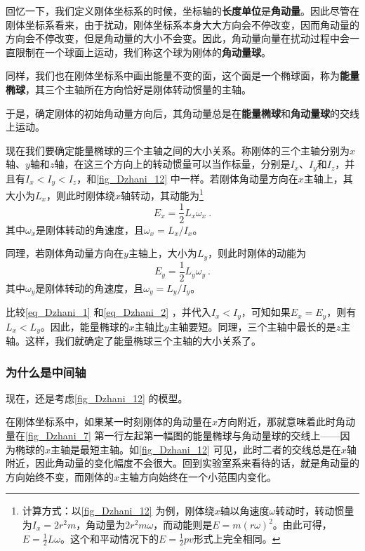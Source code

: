 回忆一下，我们定义刚体坐标系的时候，坐标轴的\textbf{长度单位}是\textbf{角动量}。因此尽管在刚体坐标系看来，由于扰动，刚体坐标系本身大大方向会不停改变，因而角动量的方向会不停改变，但是角动量的大小不会变。因此，角动量向量在扰动过程中会一直限制在一个球面上运动，我们称这个球为刚体的\textbf{角动量球}。


同样，我们也在刚体坐标系中画出能量不变的面，这个面是一个椭球面，称为\textbf{能量椭球}，其三个主轴所在方向恰好是刚体转动惯量的主轴。

于是，确定刚体的初始角动量方向后，其角动量总是在\textbf{能量椭球}和\textbf{角动量球}的交线上运动。

现在我们要确定能量椭球的三个主轴之间的大小关系。称刚体的三个主轴分别为$x$轴、$y$轴和$z$轴，在这三个方向上的转动惯量可以当作标量，分别是$I_x$、$I_y$和$I_z$，并且有$I_x<I_y<I_z$，和\autoref{fig_Dzhani_12} 中一样。若刚体角动量方向在$x$主轴上，其大小为$L_x$，则此时刚体绕$x$轴转动，其动能为\footnote{计算方式：以\autoref{fig_Dzhani_12} 为例，刚体绕$x$轴以角速度$\omega$转动时，转动惯量为$I_x=2r^2m$，角动量为$2r^2m\omega$，而动能则是$E=m(r\omega)^2$。由此可得，$E=\frac{1}{2}L\omega$。这个和平动情况下的$E=\frac{1}{2}pv$形式上完全相同。}
\begin{equation}\label{eq_Dzhani_1}
E_x = \frac{1}{2}L_x\omega_x~. 
\end{equation}
其中$\omega_x$是刚体转动的角速度，且$\omega_x=L_x/I_x$。

同理，若刚体角动量方向在$y$主轴上，大小为$L_y$，则此时刚体的动能为
\begin{equation}\label{eq_Dzhani_2}
E_y = \frac{1}{2}L_y\omega_y~. 
\end{equation}
其中$\omega_y$是刚体转动的角速度，且$\omega_y=L_y/I_y$。

比较\autoref{eq_Dzhani_1} 和\autoref{eq_Dzhani_2} ，并代入$I_x<I_y$，可知如果$E_x=E_y$，则有$L_x<L_y$。因此，能量椭球的$x$主轴比$y$主轴要短。同理，三个主轴中最长的是$z$主轴。这样，我们就确定了能量椭球三个主轴的大小关系了。



\subsubsection{为什么是中间轴}



现在，还是考虑\autoref{fig_Dzhani_12} 的模型。

在刚体坐标系中，如果某一时刻刚体的角动量在$x$方向附近，那就意味着此时角动量在\autoref{fig_Dzhani_7} 第一行左起第一幅图的能量椭球与角动量球的交线上——因为椭球的$x$主轴是最短主轴。如\autoref{fig_Dzhani_12} 可见，此时二者的交线总是在$x$轴附近，因此角动量的变化幅度不会很大。回到实验室系来看待的话，就是角动量的方向始终不变，而刚体的$x$主轴方向始终在一个小范围内变化。

